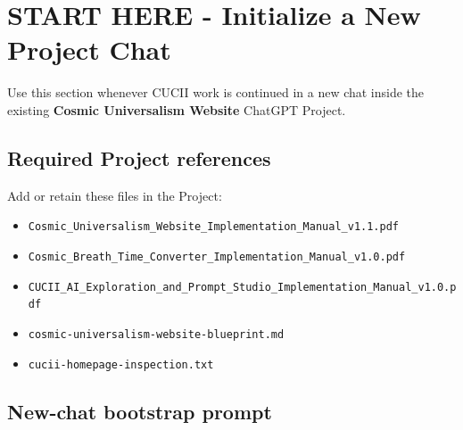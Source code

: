 \documentclass[11pt,letterpaper]{article}
\newcommand{\filepath}[1]{\texttt{#1}}
\begin{document}
\clearpage
\tableofcontents
\clearpage

\section*{START HERE - Initialize a New Project Chat}

Use this section whenever CUCII work is continued in a new chat inside the
existing \textbf{Cosmic Universalism Website} ChatGPT Project.

\subsection*{Required Project references}

Add or retain these files in the Project:

\begin{itemize}
    \item \filepath{Cosmic\_Universalism\_Website\_Implementation\_Manual\_v1.1.pdf}
    \item \filepath{Cosmic\_Breath\_Time\_Converter\_Implementation\_Manual\_v1.0.pdf}
    \item \filepath{CUCII\_AI\_Exploration\_and\_Prompt\_Studio\_Implementation\_Manual\_v1.0.pdf}
    \item \filepath{cosmic-universalism-website-blueprint.md}
    \item \filepath{cucii-homepage-inspection.txt}
\end{itemize}

\subsection*{New-chat bootstrap prompt}
\end{document}
